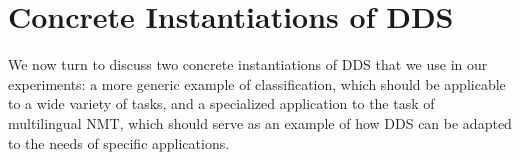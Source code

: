 \section{\label{sec:formualtion}Concrete Instantiations of DDS}

We now turn to discuss two concrete instantiations of DDS that we use in our experiments: a more generic example of classification, which should be applicable to a wide variety of tasks, and a specialized application to the task of multilingual NMT, which should serve as an example of how DDS can be adapted to the needs of specific applications.





